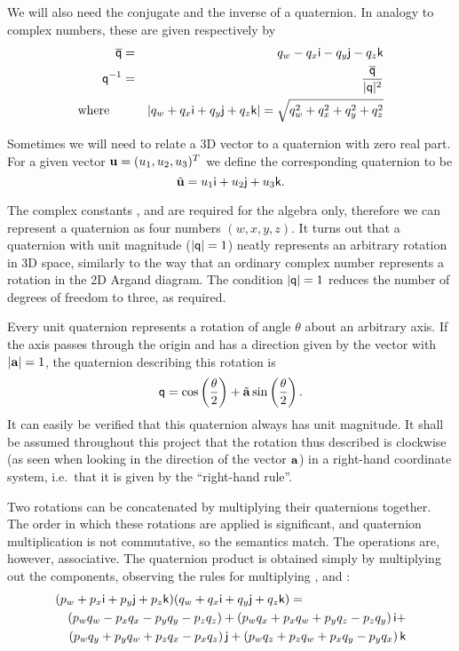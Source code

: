 We will also need the conjugate and the inverse of a quaternion. In analogy to
complex numbers, these are given respectively by
\begin{eqnarray}
\overline{\mathsf{q}} & = & q_w - q_x\mathsf{i} - q_y\mathsf{j} - q_z\mathsf{k}\\
\mathsf{q}^{-1} & = & \frac{\overline{\mathsf{q}}}{|\mathsf{q}|^2}\\
\mathrm{where}\quad&& |q_w + q_x\mathsf{i} + q_y\mathsf{j} + q_z\mathsf{k}| =
    \sqrt{q_w^2 + q_x^2 + q_y^2 + q_z^2}
\end{eqnarray}

Sometimes we will need to relate a 3D vector to a quaternion with zero real part.
For a given vector $\ve{u} = (u_1, u_2, u_3)^T$ we define the corresponding
quaternion to be
\begin{equation}
\label{vectorToQuat}
\tilde{\ve{u}} = u_1\qi + u_2\qj + u_3\qk.
\end{equation}

The complex constants \qi{}, \qj{} and \qk{} are required for the algebra
only, therefore we can represent a quaternion as four numbers $(w,x,y,z)$. It turns out that a
quaternion with unit magnitude ($|\mathsf{q}| = 1$) neatly represents an arbitrary rotation in
3D space, similarly to the way that an ordinary complex number represents a rotation in the 2D
Argand diagram. The condition $|\mathsf{q}| = 1$ reduces the number of degrees of freedom to
three, as required.

Every unit quaternion represents a rotation of angle $\theta$ about an arbitrary axis.
If the axis passes through the origin and has a direction given by the vector
 with $\norm{\ve{a}} = 1$, the quaternion describing this rotation is
\begin{equation}
\label{quatRotation}
\q{q} = \cos\left(\frac{\theta}{2}\right) + \tilde{\ve{a}} \sin\left(\frac{\theta}{2}\right).
\end{equation}
It can easily be verified that this quaternion always has unit magnitude. It shall be assumed
throughout this project that the rotation thus described is clockwise (as seen when looking in
the direction of the vector $\ve{a}$) in a right-hand coordinate system, i.e.\ that it is
given by the ``right-hand rule''.

Two rotations can be concatenated by multiplying their quaternions together. The order in which
these rotations are applied is significant, and quaternion multiplication is not commutative,
so the semantics match. The operations are, however, associative. The quaternion product is
obtained simply by multiplying out the components, observing the rules for multiplying \qi{},
\qj{} and \qk{}:
\begin{eqnarray}
\lefteqn{(p_w + p_x\qi + p_y\qj + p_z\qk)(q_w + q_x\qi + q_y\qj + q_z\qk) = } \nonumber\\*
&& (p_w q_w - p_x q_x - p_y q_y - p_z q_z) + 
   (p_w q_x + p_x q_w + p_y q_z - p_z q_y) \,\qi + \nonumber\\*
&& (p_w q_y + p_y q_w + p_z q_x - p_x q_z) \,\qj + 
   (p_w q_z + p_z q_w + p_x q_y - p_y q_x) \,\qk \label{quatProduct}
\end{eqnarray}

